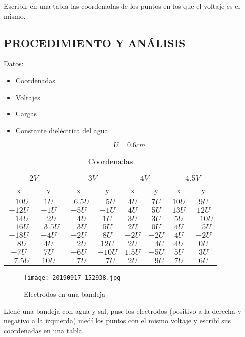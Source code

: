 \documentclass[10pt, twoside]{article}
\begin{document}
Escribir en una tabla las coordenadas de los puntos en los que
el voltaje es el mismo.

\subsection{PROCEDIMIENTO Y ANÁLISIS}%
Datos:
\begin{itemize}
	\item Coordenadas
	\item Voltajes
	\item Cargas
	\item Constante dieléctrica del agua
\end{itemize}

\[
	U = 0.6cm
\]

\begin{table}[H]
	\centering
	\caption{Coordenadas}
	\label{tab:coordenadas}
	\begin{tabular}{c|c||c|c||c|c||c|c}
		\multicolumn{2}{c||}{$2V$}
		&\multicolumn{2}{c||}{$3V$}
		&\multicolumn{2}{c||}{$4V$}
		&\multicolumn{2}{c}{$4.5V$}\\
		\hline
		\hline
		x & y & x & y & x & y & x & y\\
		\hline
		$-10U$ & $1U$ & $-6.5U$ & $-5U$ & $4U$ & $7U$ & $10U$ & $9U$\\
		\hline
		$-12U$ & $-1U$ & $-5U$ & $-1U$ & $4U$ & $5U$ & $13U$ & $12U$\\
		\hline
		$-14U$ & $-2U$ & $-4U$ & $1U$ & $3U$ & $3U$ & $5U$ & $-10U$\\
		\hline
		$-16U$ & $-3.5U$ & $-3U$ & $5U$ & $2U$ & $0U$ & $4U$ & $-5U$\\
		\hline
		$-18U$ & $-4U$ & $-2U$ & $8U$ & $-2U$ & $-2U$ & $4U$ & $-2U$\\
		\hline
		$-8U$ & $4U$ & $-2U$ & $12U$ & $2U$ & $-4U$ & $4U$ & $0U$\\
		\hline
		$-7U$ & $7U$ & $-6U$ & $-10U$ & $1.5U$ & $-5U$ & $5U$ & $3U$\\
		\hline
		$-7.5U$ & $10U$ & $-7U$ & $-7U$ & $2U$ & $-9U$ & $7U$ & $6U$\\
		\hline
	\end{tabular}
\end{table}

\begin{figure}[H]
	\centering
	\texttt{[image: 20190917\_152938.jpg]}
	\caption{Electrodos en una bandeja}%
	\label{fig:bandeja}
\end{figure}

Llené una bandeja con agua y sal,
puse los electrodos (positivo a la derecha y negativo a la izquierda)
medí los puntos con el mismo voltaje
y escribí sus coordenadas en una tabla.
\end{document}
